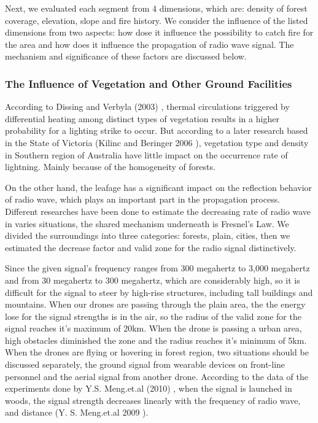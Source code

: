 \documentclass[13pt]{ctexart} %
\begin{document}
Next, we evaluated each segment from 4 dimensions, which are: density of forest coverage, elevation, slope and fire history. We consider the influence of the listed dimensions from two aspects: how dose it influence the possibility to catch fire for the area and how does it influence the propagation of radio wave signal. The mechanism and significance of these factors are discussed below.

\subsubsection{The Influence of Vegetation and Other Ground Facilities}
According to Dissing and Verbyla (2003) \cite{Dorte-lightning01}, thermal circulations triggered by differential heating among distinct types of vegetation results in a higher probability for a lighting strike to occur. But according to a later research based in the State of Victoria (Kilinc and Beringer 2006 \cite{Musa-lightning02}), vegetation type and density in Southern region of Australia have little impact on the occurrence rate of lightning. Mainly because of the homogeneity of forests.

On the other hand, the leafage has a significant impact on the reflection behavior of radio wave, which plays an important part in the propagation process. Different researches have been done to estimate the decreasing rate of radio wave in varies situations, the shared mechanism underneath is Fresnel's Law. We divided the surroundings into three categories: forests, plain, cities, then we estimated the decrease factor and valid zone for the radio signal distinctively.

Since the given signal's frequency ranges from 300 megahertz to 3,000 megahertz and from 30 megahertz to 300 megahertz, which are considerably high, so it is difficult for the signal to steer by high-rise structures, including tall buildings and mountains. When our drones are passing through the plain area, the the energy lose for the signal strengths is in the air, so the radius of the valid zone for the signal reaches it's maximum of 20km. When the drone is passing a urban area, high obstacles diminished the zone and the radius reaches it's minimum of 5km. When the drones are flying or hovering in forest region, two situations should be discussed separately, the ground signal from wearable devices on front-line personnel and the aerial signal from another drone. According to the data of the experiments done by Y.S. Meng.et.al (2010) \cite{Ng-vhf-radio}, when the signal is launched in woods, the signal strength decreases linearly with the frequency of radio wave, and distance (Y. S. Meng.et.al 2009 \cite{Ng-vhfuhf-ieee}).
\end{document}
